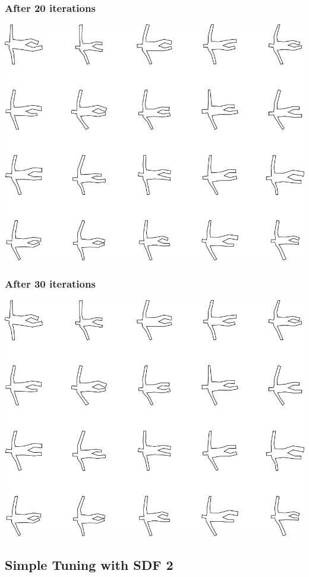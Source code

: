 \subsubsection{After 20 iterations}

\includegraphics[width=6in]{output/3.learning/simple_tuning/simple_tuning_iter20_.png}
\subsubsection{After 30 iterations}

\includegraphics[width=6in]{output/3.learning/simple_tuning/simple_tuning_iter30_.png}
\subsection{Simple Tuning with SDF 2}


